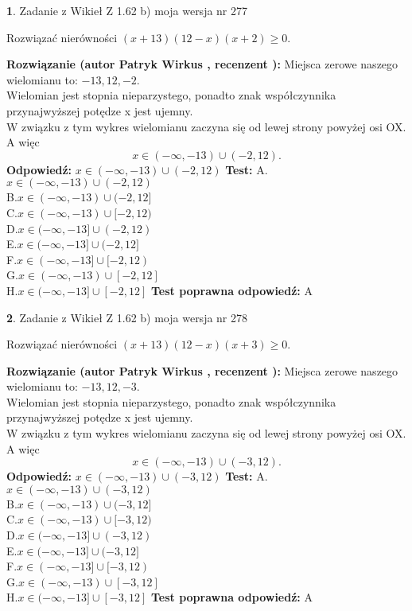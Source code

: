 \documentclass[12pt, a4paper]{article}
\theoremstyle{definition} %
\newtheorem{zad}{}
\newcommand{\zadStart}[1]{\begin{zad}#1\newline}
\newcommand{\zadStop}{\end{zad}}
\newcommand{\rozwStart}[2]{\noindent \textbf{Rozwiązanie (autor #1 , recenzent #2): }\newline}
\newcommand{\rozwStop}{\newline}
\newcommand{\odpStart}{\noindent \textbf{Odpowiedź:}\newline}
\newcommand{\odpStop}{\newline}
\newcommand{\testStart}{\noindent \textbf{Test:}\newline}
\newcommand{\testStop}{\newline}
\newcommand{\kluczStart}{\noindent \textbf{Test poprawna odpowiedź:}\newline}
\newcommand{\kluczStop}{\newline}
\begin{document}
\zadStart{Zadanie z Wikieł Z 1.62 b) moja wersja nr 277}

Rozwiązać nierówności $(x+13)(12-x)(x+2)\ge0$.
\zadStop
\rozwStart{Patryk Wirkus}{}
Miejsca zerowe naszego wielomianu to: $-13, 12, -2$.\\
Wielomian jest stopnia nieparzystego, ponadto znak współczynnika przy\linebreak najwyższej potędze x jest ujemny.\\ W związku z tym wykres wielomianu zaczyna się od lewej strony powyżej osi OX. A więc $$x \in (-\infty,-13) \cup (-2,12).$$
\rozwStop
\odpStart
$x \in (-\infty,-13) \cup (-2,12)$
\odpStop
\testStart
A.$x \in (-\infty,-13) \cup (-2,12)$\\
B.$x \in (-\infty,-13) \cup (-2,12]$\\
C.$x \in (-\infty,-13) \cup [-2,12)$\\
D.$x \in (-\infty,-13] \cup (-2,12)$\\
E.$x \in (-\infty,-13] \cup (-2,12]$\\
F.$x \in (-\infty,-13] \cup [-2,12)$\\
G.$x \in (-\infty,-13) \cup [-2,12]$\\
H.$x \in (-\infty,-13] \cup [-2,12]$
\testStop
\kluczStart
A
\kluczStop



\zadStart{Zadanie z Wikieł Z 1.62 b) moja wersja nr 278}

Rozwiązać nierówności $(x+13)(12-x)(x+3)\ge0$.
\zadStop
\rozwStart{Patryk Wirkus}{}
Miejsca zerowe naszego wielomianu to: $-13, 12, -3$.\\
Wielomian jest stopnia nieparzystego, ponadto znak współczynnika przy\linebreak najwyższej potędze x jest ujemny.\\ W związku z tym wykres wielomianu zaczyna się od lewej strony powyżej osi OX. A więc $$x \in (-\infty,-13) \cup (-3,12).$$
\rozwStop
\odpStart
$x \in (-\infty,-13) \cup (-3,12)$
\odpStop
\testStart
A.$x \in (-\infty,-13) \cup (-3,12)$\\
B.$x \in (-\infty,-13) \cup (-3,12]$\\
C.$x \in (-\infty,-13) \cup [-3,12)$\\
D.$x \in (-\infty,-13] \cup (-3,12)$\\
E.$x \in (-\infty,-13] \cup (-3,12]$\\
F.$x \in (-\infty,-13] \cup [-3,12)$\\
G.$x \in (-\infty,-13) \cup [-3,12]$\\
H.$x \in (-\infty,-13] \cup [-3,12]$
\testStop
\kluczStart
A
\kluczStop
\end{document}
